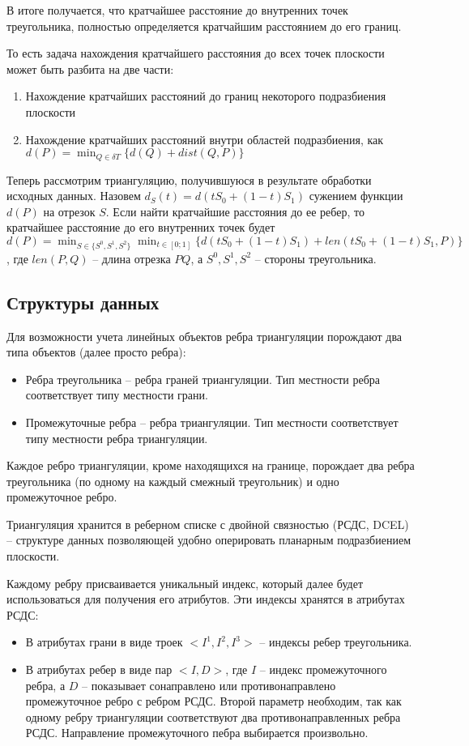 В итоге получается, что кратчайшее расстояние до внутренних точек треугольника,
полностью определяется кратчайшим расстоянием до его границ.

То есть задача нахождения кратчайшего расстояния до всех точек плоскости
может быть разбита на две части:
\begin{enumerate}
\item Нахождение кратчайших расстояний до границ некоторого подразбиения плоскости
\item Нахождение кратчайших расстояний внутри областей подразбиения, как
$d(P) = \min_{Q \in \delta T} \{d(Q) + dist(Q, P)\}$
\end{enumerate}

Теперь рассмотрим триангуляцию, получившуюся в результате обработки исходных данных.
Назовем $d_S(t) = d(tS_0 + (1-t)S_1)$ сужением функции $d(P)$ на отрезок $S$.
Если найти кратчайшие расстояния до ее ребер, то кратчайшее расстояние до
его внутренних точек будет
$d(P) = \min_{S \in \{S^0, S^1, S^2\} } \min_{t \in [0; 1] } \{d(tS_0 + (1-t)S_1) + len(tS_0 + (1-t)S_1, P)\}$,
где $len(P, Q)$ -- длина отрезка $PQ$, а $S^0, S^1, S^2$ -- стороны треугольника.

\subsection{Структуры данных}
Для возможности учета линейных объектов ребра триангуляции порождают
два типа объектов (далее просто ребра):
\begin{itemize}
\item Ребра треугольника -- ребра граней триангуляции.
Тип местности ребра соответствует типу местности грани.
\item Промежуточные ребра -- ребра триангуляции.
Тип местности соответствует типу местности ребра триангуляции.
\end{itemize}
Каждое ребро триангуляции, кроме находящихся на границе, порождает
два ребра треугольника (по одному на каждый смежный треугольник)
и одно промежуточное ребро.

Триангуляция хранится в реберном списке с двойной связностью
(РСДС, DCEL) -- структуре данных позволяющей удобно оперировать
планарным подразбиением плоскости.

Каждому ребру присваивается уникальный индекс, который далее
будет использоваться для получения его атрибутов.
Эти индексы хранятся в атрибутах РСДС:
\begin{itemize}
\item В атрибутах грани в виде троек $<I^1, I^2, I^3>$ --
индексы ребер треугольника.
\item В атрибутах ребер  в виде пар $<I, D>$, где $I$ --
индекс промежуточного ребра, а $D$ -- показывает сонаправлено или
противонаправлено промежуточное ребро с ребром РСДС. Второй
параметр необходим, так как одному ребру триангуляции соответствуют
два противонаправленных ребра РСДС. Направление промежуточного пебра
выбирается произвольно.
\end{itemize}

